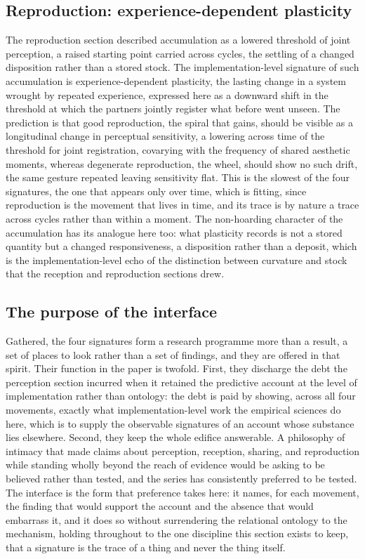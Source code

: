 \subsection{Reproduction: experience-dependent plasticity}
\label{p22:sub:neuro-reproduction}

The reproduction section described accumulation as a lowered threshold of joint perception, a raised starting point carried across cycles, the settling of a changed disposition rather than a stored stock. The implementation-level signature of such accumulation is experience-dependent plasticity, the lasting change in a system wrought by repeated experience, expressed here as a downward shift in the threshold at which the partners jointly register what before went unseen. The prediction is that good reproduction, the spiral that gains, should be visible as a longitudinal change in perceptual sensitivity, a lowering across time of the threshold for joint registration, covarying with the frequency of shared aesthetic moments, whereas degenerate reproduction, the wheel, should show no such drift, the same gesture repeated leaving sensitivity flat. This is the slowest of the four signatures, the one that appears only over time, which is fitting, since reproduction is the movement that lives in time, and its trace is by nature a trace across cycles rather than within a moment. The non-hoarding character of the accumulation has its analogue here too: what plasticity records is not a stored quantity but a changed responsiveness, a disposition rather than a deposit, which is the implementation-level echo of the distinction between curvature and stock that the reception and reproduction sections drew.

\subsection{The purpose of the interface}
\label{p22:sub:neuro-purpose}

Gathered, the four signatures form a research programme more than a result, a set of places to look rather than a set of findings, and they are offered in that spirit. Their function in the paper is twofold. First, they discharge the debt the perception section incurred when it retained the predictive account at the level of implementation rather than ontology: the debt is paid by showing, across all four movements, exactly what implementation-level work the empirical sciences do here, which is to supply the observable signatures of an account whose substance lies elsewhere. Second, they keep the whole edifice answerable. A philosophy of intimacy that made claims about perception, reception, sharing, and reproduction while standing wholly beyond the reach of evidence would be asking to be believed rather than tested, and the series has consistently preferred to be tested. The interface is the form that preference takes here: it names, for each movement, the finding that would support the account and the absence that would embarrass it, and it does so without surrendering the relational ontology to the mechanism, holding throughout to the one discipline this section exists to keep, that a signature is the trace of a thing and never the thing itself.

